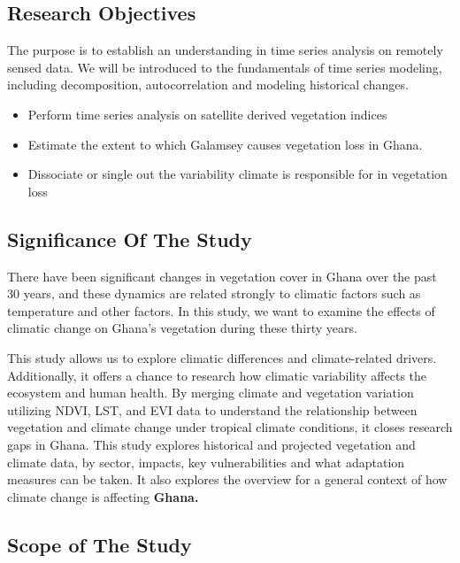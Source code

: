 \documentclass[12pt,a4paper]{book}
\begin{document}
{\hypertarget{research-objectives}{%
\subsection{Research Objectives}\label{research-objectives}}

The purpose is to establish an understanding in time series analysis on
remotely sensed data. We will be introduced to the fundamentals of time
series modeling, including decomposition, autocorrelation and modeling
historical changes.

\begin{itemize}
\item
  Perform time series analysis on satellite derived vegetation indices
\item
  Estimate the extent to which Galamsey causes vegetation loss in Ghana.
\item
  Dissociate or single out the variability climate is responsible for in
  vegetation loss
\end{itemize}

\hypertarget{significance-of-the-study}{%
\subsection{Significance Of The Study}\label{significance-of-the-study}}

There have been significant changes in vegetation cover in Ghana over
the past 30 years, and these dynamics are related strongly to climatic
factors such as temperature and other factors. In this study, we want to
examine the effects of climatic change on Ghana's vegetation during
these thirty years.

This study allows us to explore climatic differences and climate-related
drivers. Additionally, it offers a chance to research how climatic
variability affects the ecosystem and human health. By merging climate
and vegetation variation utilizing NDVI, LST, and EVI data to understand
the relationship between vegetation and climate change under tropical
climate conditions, it closes research gaps in Ghana. This study
explores historical and projected vegetation and climate data, by
sector, impacts, key vulnerabilities and what adaptation measures can be
taken. It also explores the overview for a general context of how
climate change is affecting \textbf{Ghana.}

\hypertarget{scope-of-the-study}{%
\subsection{Scope of The Study}\label{scope-of-the-study}}

}
\end{document}
